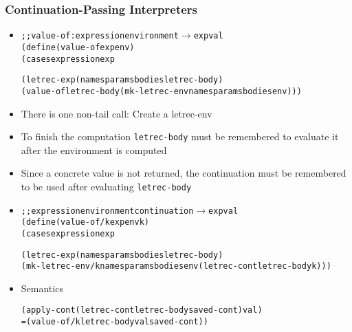 \documentclass{beamer}
\newcommand{\arrow}{\(\rightarrow\)}
\begin{document}
\begin{frame}[fragile]
\frametitle{Continuation-Passing Interpreters}
\begin{scriptsize}
\begin{itemize}
\item<1->
\begin{alltt}
;; value-of : expression environment \arrow{} expval
(define (value-of exp env)
 (cases expression exp

  (letrec-exp (names params bodies letrec-body)
   (value-of letrec-body (mk-letrec-env names params bodies env)))
\end{alltt}

\item<1-> There is one non-tail call: Create a letrec-env

\item<1-> To finish the computation \texttt{letrec-body} must be remembered to evaluate it after the environment is computed

\item<1-> Since a concrete value is not returned, the continuation must be remembered to be used after evaluating \texttt{letrec-body}
\item<2->
\begin{alltt}
;; expression environment continuation \arrow{} expval
(define (value-of/k exp env k)
 (cases expression exp

  (letrec-exp (names params bodies letrec-body)
   (mk-letrec-env/k names params bodies env (letrec-cont letrec-body k)))
\end{alltt}

\item<3-> Semantics
\begin{alltt}
  (apply-cont (letrec-cont letrec-body saved-cont) val)
= (value-of/k letrec-body val saved-cont))
\end{alltt}

\end{itemize}
\end{scriptsize}
\end{frame}
\end{document}
